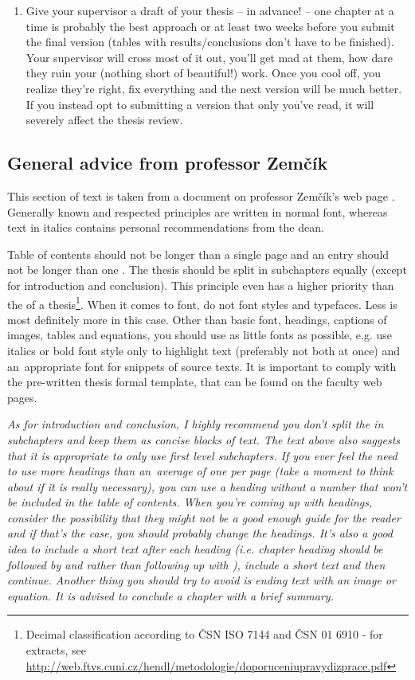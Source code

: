 {{\begin{enumerate}
  \item{Give your supervisor a draft of your thesis -- in advance! -- one chapter at a time is probably the best approach or at least two weeks before you submit the final version (tables with results/conclusions don't have to be finished). Your supervisor will cross most of it out, you'll get mad at them, how dare they ruin your (nothing short of beautiful!) work. Once you cool off, you realize they're right, fix everything and the next version will be much better. If you instead opt to submitting a version that only you've read, it will severely affect the thesis review.}
\end{enumerate}

\subsection*{General advice from professor Zemčík}
This section of text is taken from a document on professor Zemčík's web page \cite{Zemcik}. Generally known and respected principles are written in normal font, whereas text in italics contains  personal recommendations from the dean.

Table of contents should not be longer than a single page and an entry should not be longer than one . The thesis should be split in subchapters equally (except for introduction and conclusion). This principle even has a higher priority than the  of a thesis\footnote{Decimal classification according to ČSN ISO 7144 and ČSN 01 6910 - for extracts, see \url{http://web.ftvs.cuni.cz/hendl/metodologie/doporuceniupravydizprace.pdf}}. When it comes to font, do not  font styles and typefaces. Less is most definitely more in this case. Other than basic font, headings, captions of images, tables and equations, you should use as little fonts as possible, e.g. use italics or bold font style only to highlight text (preferably not both at once) and an~appropriate  font for snippets of source texts. It is important to comply with the pre-written thesis formal template, that can be found on the faculty web pages.

\it As for introduction and conclusion, I highly recommend you don't split the in subchapters and keep them as concise blocks of text. The text above also suggests that it is appropriate to only use first level subchapters. If you ever feel the need to use more headings than an~average of one per page (take a moment to think about if it is really necessary), you can use a  heading without a number that won't be included in the table of contents. When you're coming up with headings, consider the possibility that they might not be a good enough guide for the reader and if that's the case, you should probably change the headings. It's also a good idea to include a short text after each heading (i.e. chapter heading should be followed by  and rather than following up with ), include a short text and then continue. Another thing you should try to avoid is ending text with an image or equation. It is advised to conclude a chapter with a brief summary.

}}
